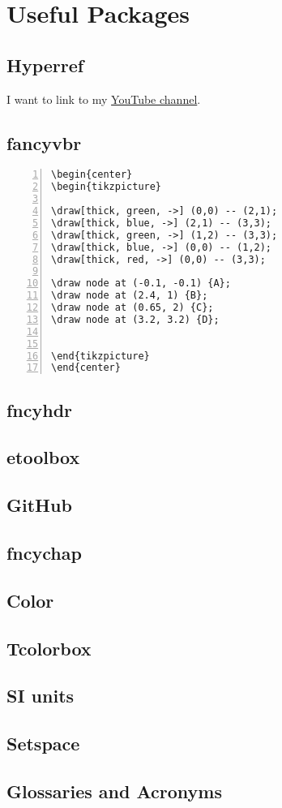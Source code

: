 \documentclass{report}
\begin{document}
\tableofcontents

\chapter{Useful Packages}

\section{Hyperref} 
I want to link to my \href{http://youtube.com/drtreforbazett}{YouTube channel}. 

\section{fancyvbr}

\begin{Verbatim}[numbers=left, frame=single, formatcom=\color{red}]
\begin{center}
\begin{tikzpicture}

\draw[thick, green, ->] (0,0) -- (2,1);
\draw[thick, blue, ->] (2,1) -- (3,3);
\draw[thick, green, ->] (1,2) -- (3,3);
\draw[thick, blue, ->] (0,0) -- (1,2);
\draw[thick, red, ->] (0,0) -- (3,3);

\draw node at (-0.1, -0.1) {A};
\draw node at (2.4, 1) {B};
\draw node at (0.65, 2) {C};
\draw node at (3.2, 3.2) {D};


\end{tikzpicture}
\end{center}
\end{Verbatim}

\section{fncyhdr}

\section{etoolbox}

\section{GitHub}

\section{fncychap}

\section{Color}

\section{Tcolorbox}

\section{SI units}

\section{Setspace}

\section{Glossaries and Acronyms}
\end{document}
